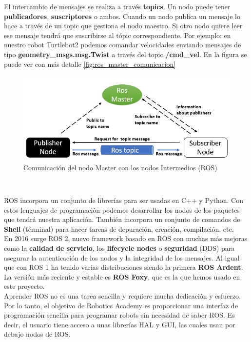 El intercambio de mensajes se realiza a través \textbf{topics}. Un nodo puede tener \textbf{publicadores}, \textbf{suscriptores} o ambos. Cuando un nodo publica un mensaje lo hace a través de un topic que gestiona el nodo maestro. Si otro nodo quiere leer ese mensaje tendrá que suscribirse al tópic correspondiente. Por ejemplo: en nuestro robot Turtlebot2 podemos comandar velocidades enviando mensajes de tipo \textbf{geometry\_msgs.msg.Twist} a través del topic \textbf{/cmd\_vel}. En la figura se puede ver con más detalle \ref{fig:ros_master_comunicacion}\\

\begin{figure} [H]
  \begin{center}
    \includegraphics[width=15cm]{imagenes/ros_master_communication.png}
  \end{center}
  \caption{Comunicación del nodo Master con los nodos Intermedios (ROS)}
  \label{fig:ros_master_comunicación}
\end{figure}\

ROS incorpora un conjunto de librerías para ser usadas en C++ y Python. Con estos lenguajes de programación podemos desarrollar los nodos de los paquetes que tendrá nuestra aplicación. También incorpora un conjunto de comandos de \textbf{Shell} (términal) para hacer tareas de depuración, creación, compilación, etc.\\

En 2016 surge ROS 2, nuevo framework basado en ROS con muchas más mejoras como la \textbf{calidad de servicio}, los \textbf{lifecycle nodes} o \textbf{seguridad} (DDS) para asegurar la autenticación de los nodos y la integridad de los mensajes. Al igual que con ROS 1 ha tenido varias distribuciones siendo la primera \textbf{ROS Ardent}. La versión más reciente y estable es \textbf{ROS Foxy}, que es la que hemos usado en este proyecto.\\

Aprender ROS no es una tarea sencilla y requiere mucha dedicación y esfuerzo. Por lo tanto, el objetivo de Robotics Academy es proporcionar una interfaz de programación sencilla para programar robots sin necesidad de saber ROS. Es decir, el usuario tiene acceso a unas librerías HAL y GUI, las cuales usan por debajo nodos de ROS.\\

